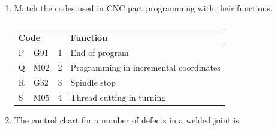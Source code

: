\documentclass[journal,12pt,onecolumn]{IEEEtran}
\theoremstyle{remark}
\begin{document}
\begin{enumerate}
    \hfill{}
    \begin{enumerate}
    \end{enumerate}

    \item Match the codes used in CNC part programming with their functions.
    \begin{table}[h]
        \centering
        \caption*{}
        \label{tab:q18}
        \begin{tabular}{llcl}
            \hline
            \multicolumn{2}{l}{Code} & & Function \\
            \hline
            P & G91 & 1 & End of program \\
            Q & M02 & 2 & Programming in incremental coordinates \\
            R & G32 & 3 & Spindle stop \\
            S & M05 & 4 & Thread cutting in turning \\
            \hline
        \end{tabular}
    \end{table}

    \hfill{}
    \begin{enumerate}
    \end{enumerate}

    \item The control chart for a number of defects in a welded joint is

    \hfill{}
    \begin{enumerate}
    \end{enumerate}


\end{enumerate}
\end{document}
